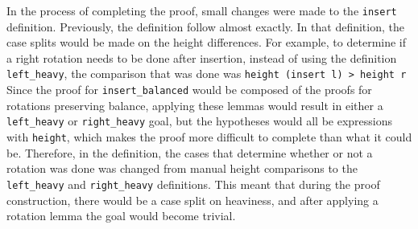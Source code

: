 In the process of completing the proof, small changes were made to the \lstinline{insert} definition. Previously, the definition follow \cite{textbook:discrete_computer} almost exactly. In that definition, the case splits would be made on the height differences. For example, to determine if a right rotation needs to be done after insertion, instead of using the definition \lstinline{left_heavy}, the comparison that was done was \lstinline{height (insert l) > height r} Since the proof for \lstinline{insert_balanced} would be composed of the proofs for rotations preserving balance, applying these lemmas would result in either a \lstinline{left_heavy} or \lstinline{right_heavy} goal, but the hypotheses would all be expressions with \lstinline{height}, which makes the proof more difficult to complete than what it could be. Therefore, in the definition, the cases that determine whether or not a rotation was done was changed from manual height comparisons to the \lstinline{left_heavy} and \lstinline{right_heavy} definitions. This meant that during the proof construction, there would be a case split on heaviness, and after applying a rotation lemma the goal would become trivial. 